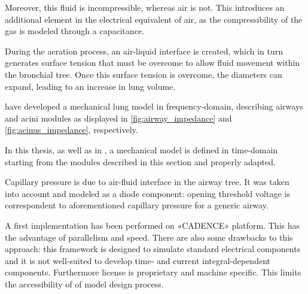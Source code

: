Moreover, this fluid is incompressible, whereas air is not. This
introduces an additional element in the electrical equivalent of air,
as the compressibility of the gas is modeled through a
capacitance.


During the aeration process, an air-liquid interface is created, which
in turn generates surface tension that must be overcome to allow fluid
movement within the bronchial tree. Once this surface tension is
overcome, the diameters can expand, leading to an increase in lung
volume.

\textcite{lutchen1997} have developed a mechanical lung model in
frequency-domain, describing airways and acini modules as displayed
in \cref{fig:airway_impedance} and \cref{fig:acinus_impedance},
respectively.




In this thesis, as well as in \cite{mani2020}, a mechanical model is
defined in time-domain starting from the modules described in this
section and properly adapted.




Capillary pressure is due to air-fluid interface in the airway tree.
It was taken into account and modeled as a diode component: opening
threshold voltage is correspondent to aforementioned capillary
pressure for a generic airway.

A first implementation has been performed on «CADENCE» platform.  This
has the advantage of parallelism and speed.  There are also some
drawbacks to this approach: this framework is designed to simulate
standard electrical components and it is not well-suited to develop
time- and current integral-dependent components.  Furthermore license
is proprietary and machine specific.  This limits the accessibility of
of model design process.


